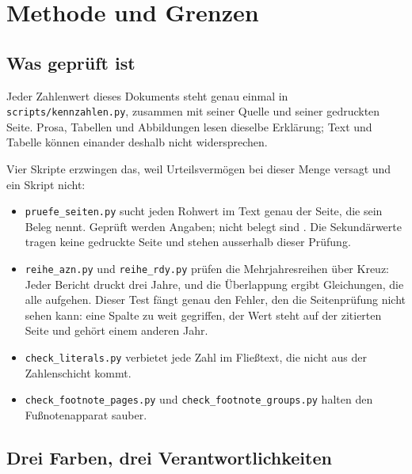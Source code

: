 \section*{Methode und Grenzen}

\subsection*{Was gepr\"uft ist}

Jeder Zahlenwert dieses Dokuments steht genau einmal in
\texttt{scripts/kennzahlen.py}, zusammen mit seiner Quelle und seiner
gedruckten Seite. Prosa, Tabellen und Abbildungen lesen dieselbe Erkl\"arung;
Text und Tabelle k\"onnen einander deshalb nicht widersprechen.

Vier Skripte erzwingen das, weil Urteilsverm\"ogen bei dieser Menge versagt
und ein Skript nicht:

\begin{itemize}
\item \texttt{pruefe\_seiten.py} sucht jeden Rohwert im Text genau der Seite,
die sein Beleg nennt. Gepr\"uft werden \MethodeWerte{} Angaben; nicht belegt
sind \MethodeFehler{}. Die \MethodeExtern{} Sekund\"arwerte tragen keine
gedruckte Seite und stehen ausserhalb dieser Pr\"ufung.
\item \texttt{reihe\_azn.py} und \texttt{reihe\_rdy.py} pr\"ufen die
Mehrjahresreihen \"uber Kreuz: Jeder Bericht druckt drei Jahre, und die
\"Uberlappung ergibt \MethodeKette{} Gleichungen, die alle aufgehen. Dieser
Test f\"angt genau den Fehler, den die Seitenpr\"ufung nicht sehen kann: eine
Spalte zu weit gegriffen, der Wert steht auf der zitierten Seite und geh\"ort
einem anderen Jahr.
\item \texttt{check\_literals.py} verbietet jede Zahl im Flie{\ss}text, die
nicht aus der Zahlenschicht kommt.
\item \texttt{check\_footnote\_pages.py} und
\texttt{check\_footnote\_groups.py} halten den Fu{\ss}notenapparat sauber.
\end{itemize}

\subsection*{Drei Farben, drei Verantwortlichkeiten}

